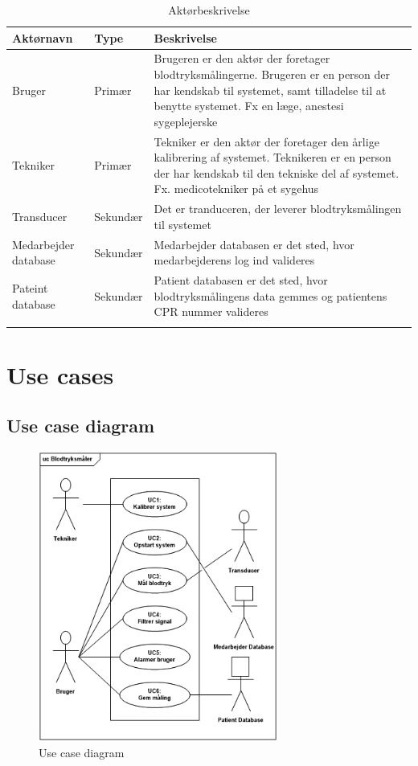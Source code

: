 \begin{longtabu}to 
	{\large \textbf{Aktørnavn}} & {\large \textbf{Type}} & {\large \textbf{Beskrivelse}}\\ \toprule
	Bruger & Primær & Brugeren er den aktør der foretager blodtryksmålingerne. Brugeren er en person der har kendskab til systemet, samt tilladelse til at benytte systemet. Fx en læge, anestesi sygeplejerske \\
	Tekniker & Primær & Tekniker er den aktør der foretager den årlige kalibrering af systemet. Teknikeren er en person der har kendskab til den tekniske del af systemet. Fx. medicotekniker på et sygehus\\
	Transducer & Sekundær & Det er tranduceren, der leverer blodtryksmålingen til systemet\\
	Medarbejder database & Sekundær & Medarbejder databasen er det sted, hvor medarbejderens log ind valideres \\
	Pateint database & Sekundær & Patient databasen er det sted, hvor blodtryksmålingens data gemmes og patientens CPR nummer valideres \\ \bottomrule
\caption{Aktørbeskrivelse}
\label{Aktoerbeskrivelse}
\end{longtabu}

\section{Use cases}
\subsection{Use case diagram}
\begin{figure}[H]
	\centering
	\includegraphics[width=0.7\textwidth]{Figurer/ISE/UcDiagram2}
	\caption{Use case diagram}
	\label{UC diagram}
\end{figure}

